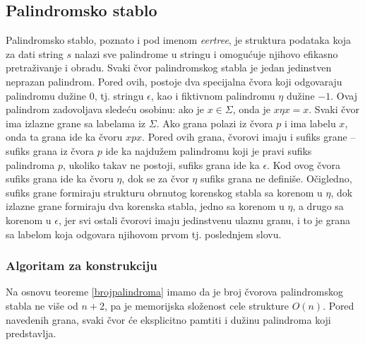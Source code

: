 \subsection{Palindromsko stablo}

Palindromsko stablo, poznato i pod imenom \textit{eertree}, je struktura podataka koja za dati string $s$ nalazi sve palindrome u stringu i omogu\' cuje njihovo efikasno pretra\v zivanje i obradu. Svaki \v cvor palindromskog stabla je jedan jedinstven neprazan palindrom. Pored ovih, postoje dva specijalna \v cvora koji odgovaraju palindromu du\v zine $0$, tj. stringu $\epsilon$, kao i fiktivnom palindromu $\eta$ du\v zine $-1$. Ovaj palindrom zadovoljava slede\' cu osobinu: ako je $x \in \Sigma$, onda je $x\eta x = x$. Svaki \v cvor ima izlazne grane sa labelama iz $\Sigma$. Ako grana polazi iz \v cvora $p$ i ima labelu $x$, onda ta grana ide ka \v cvoru $xpx$. Pored ovih grana, \v cvorovi imaju i sufiks grane -- sufiks grana iz \v cvora $p$ ide ka najdu\v zem palindromu koji je pravi sufiks palindroma $p$, ukoliko takav ne postoji, sufiks grana ide ka $\epsilon$. Kod ovog \v cvora sufiks grana ide ka \v cvoru $\eta$, dok se za \v cvor $\eta$ sufiks grana ne defini\v se. O\v cigledno, sufiks grane formiraju strukturu obrnutog korenskog stabla sa korenom u $\eta$, dok izlazne grane formiraju dva korenska stabla, jedno sa korenom u $\eta$, a drugo sa korenom u $\epsilon$, jer svi ostali \v cvorovi imaju jedinstvenu ulaznu granu, i to je grana sa labelom koja odgovara njihovom prvom tj. poslednjem slovu.

\subsubsection{Algoritam za konstrukciju}

Na osnovu teoreme \ref{brojpalindroma} imamo da je broj \v cvorova palindromskog stabla ne vi\v se od $n+2$, pa je memorijska slo\v zenost cele strukture $O(n)$. Pored navedenih grana, svaki \v cvor \' ce eksplicitno pamtiti i du\v zinu palindroma koji predstavlja.

\noindent
\begin{minipage}[l]{\textwidth}

\end{minipage}

